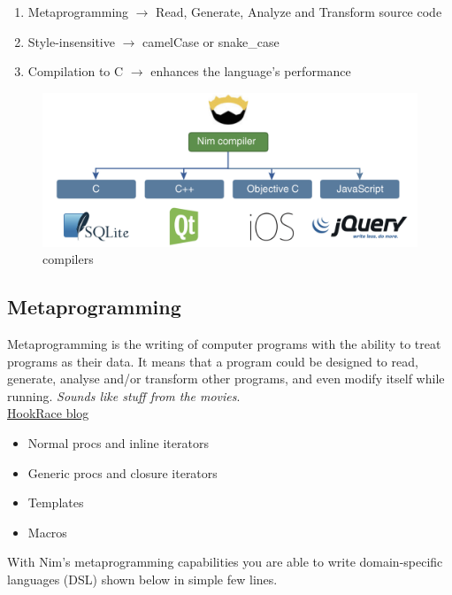 \documentclass[10pt, a4paper, twocolumn]{article} %
\begin{document}
\begin{enumerate}
	\item Metaprogramming $\longrightarrow$ Read, Generate, Analyze and Transform source code
	\item Style-insensitive $\longrightarrow$ camelCase or snake\_case
	\item Compilation to C $\longrightarrow$ enhances the language's performance
\end{enumerate}

\begin{figure}[h!]
	\includegraphics[width=\linewidth]{compiler.png} %
	\caption{compilers} %
	\label{Nim Compilers} %
\end{figure}
\newpage

\subsection{Metaprogramming}

Metaprogramming is the writing of computer programs with the ability to treat programs as their data. It means that a program could be designed to read, generate, analyse and/or transform other programs, and even modify itself while running. \textit{Sounds like stuff from the movies}.  \\

\href{https://hookrace.net/blog/introduction-to-metaprogramming-in-nim/}{HookRace blog}


\begin{itemize}
	\item Normal procs and inline iterators
	\item Generic procs  and closure iterators
	\item Templates
	\item Macros
\end{itemize}

With Nim's metaprogramming capabilities you are able to write domain-specific languages (DSL) shown below in simple few lines.
\end{document}
